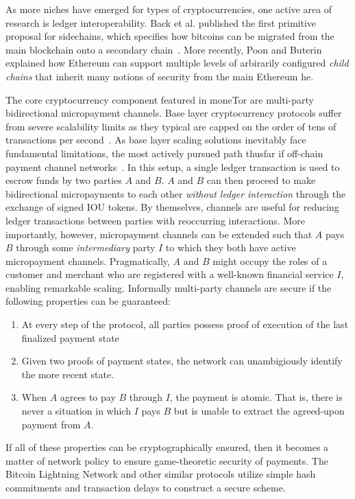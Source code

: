 As more niches have emerged for types of cryptocurrencies, one active area of
research is ledger interoperability. Back et al. published the first primitive
proposal for sidechains, which specifies how bitcoins can be migrated from the
main blockchain onto a secondary chain~\cite{back2014enabling}.  More recently,
Poon and Buterin explained how Ethereum can support multiple levels of
arbirarily configured \emph{child chains} that inherit many notions of security
from the main Ethereum he.

The core cryptocurrency component featured in moneTor are multi-party
bidirectional micropayment channels. Base layer cryptocurrency protocols suffer
from severe scalability limits as they typical are capped on the order of tens
of transactions per second~\cite{team2017blockchain}. As base layer scaling
solutions inevitably face fundamental limitations, the most actively pursued
path thusfar if off-chain payment channel networks~\cite{poon2016bitcoin}. In
this setup, a single ledger transaction is used to escrow funds by two parties
$A$ and $B$. $A$ and $B$ can then proceed to make bidirectional micropayments to
each other \emph{without ledger interaction} through the exchange of signed IOU
tokens. By themselves, channels are useful for reducing ledger transactions
between parties with reoccurring interactions. More importantly, however,
micropayment channels can be extended such that $A$ pays $B$ through some
\emph{intermediary} party $I$ to which they both have active micropayment
channels. Pragmatically, $A$ and $B$ might occupy the roles of a customer and
merchant who are registered with a well-known financial service $I$, enabling
remarkable scaling. Informally multi-party channels are secure if the following
properties can be guaranteed:

\begin{enumerate}
\item At every step of the protocol, all parties possess proof of execution of
  the last finalized payment state
\item Given two proofs of payment states, the network can unambigiously identify
  the more recent state.
\item When $A$ agrees to pay $B$ through $I$, the payment is atomic. That is,
  there is never a situation in which $I$ pays $B$ but is unable to extract the
  agreed-upon payment from $A$.
\end{enumerate}

If all of these properties can be cryptographically ensured, then it becomes a
matter of network policy to ensure game-theoretic security of payments. The
Bitcoin Lightning Network and other similar protocols utilize simple hash
commitments and transaction delays to construct a secure scheme.

